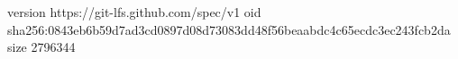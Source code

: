 version https://git-lfs.github.com/spec/v1
oid sha256:0843eb6b59d7ad3cd0897d08d73083dd48f56beaabdc4c65ecdc3ec243fcb2da
size 2796344

